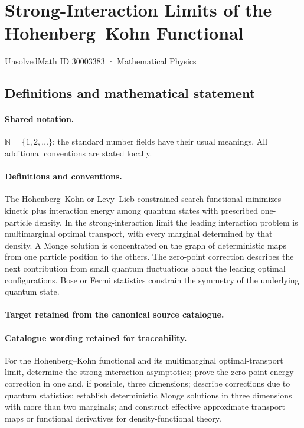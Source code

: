 \documentclass[11pt]{article}
\begin{document}
\setcounter{section}{30003382}
\section{Strong-Interaction Limits of the Hohenberg–Kohn Functional}\label{30003383}
{\small UnsolvedMath ID 30003383 · Mathematical Physics}
\subsection{Definitions and mathematical statement}

\paragraph{Shared notation.}$\mathbb N=\{1,2,\ldots\}$; the standard number fields have their usual meanings. All additional conventions are stated locally.


\paragraph{Definitions and conventions.}
The Hohenberg--Kohn or Levy--Lieb constrained-search functional minimizes kinetic plus interaction energy among quantum states with prescribed one-particle density. In the strong-interaction limit the leading interaction problem is multimarginal optimal transport, with every marginal determined by that density. A Monge solution is concentrated on the graph of deterministic maps from one particle position to the others. The zero-point correction describes the next contribution from small quantum fluctuations about the leading optimal configurations. Bose or Fermi statistics constrain the symmetry of the underlying quantum state.

\paragraph{Target retained from the canonical source catalogue.}
\paragraph{Catalogue wording retained for traceability.}
For the Hohenberg–Kohn functional and its multimarginal optimal-transport limit, determine the strong-interaction asymptotics; prove the zero-point-energy correction in one and, if possible, three dimensions; describe corrections due to quantum statistics; establish deterministic Monge solutions in three dimensions with more than two marginals; and construct effective approximate transport maps or functional derivatives for density-functional theory.
\end{document}
